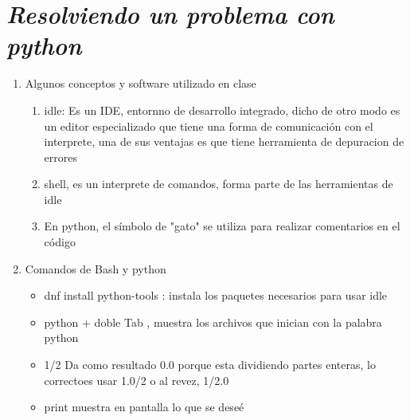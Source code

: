 \documentclass{book}
\begin{document}


\section{\textit{Resolviendo un problema con python}}%
\begin{flushright}
	\date{10 de enero de 2019}
\end{flushright}


\begin{enumerate}%
	\item Algunos conceptos y software utilizado en clase%
	\begin{enumerate}
		\item idle: Es un IDE, entornno de desarrollo integrado, dicho de otro modo es un editor especializado que tiene una forma de comunicación con el interprete, una de sus ventajas es que tiene herramienta de depuracion de errores
		\item shell, es un interprete de comandos, forma parte de las herramientas de idle
		\item En python, el símbolo de "gato" se utiliza para realizar comentarios en el código
	\end{enumerate}
	
	\item Comandos de Bash y python %
	\begin{itemize}%
		\item dnf install python-tools : instala los paquetes necesarios para usar idle
		\item python + doble Tab , muestra los archivos que inician con la palabra python
		\item 1/2 Da como resultado 0.0 porque esta dividiendo partes enteras, lo correctoes usar 1.0/2 o al revez, 1/2.0
		\item print muestra en pantalla lo que se deseé
		
		
	\end{itemize}%
	
	
	
	
\end{enumerate}%
\end{document}
